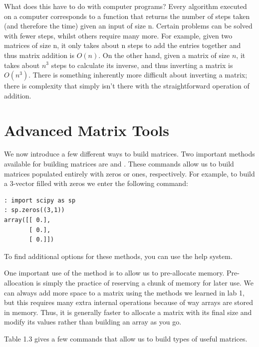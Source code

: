 What does this have to do with computer programs?  
Every algorithm executed on a computer corresponds to a function 
that returns the number of steps taken (and therefore the time) 
given an input of size n.  Certain problems can be solved with fewer steps,
whilst others require many more.  For example, given two matrices of size n,
it only takes about n steps to add the entries together and thus matrix addition is $O(n)$.  
On the other hand, given a matrix of size $n$, it takes about 
$n^3$ steps to calculate its inverse, 
and thus inverting a matrix is $O(n^3)$.
There is something inherently more difficult about inverting a matrix; 
there is complexity that simply isn't there with the straightforward operation of addition.
	
\section*{Advanced Matrix Tools}
We now introduce a few different ways to build matrices. 
Two important methods available for building matrices are  and .
These commands allow us to build matrices populated entirely with zeros or ones, respectively.
For example, to build a 3-vector filled with zeros we enter the following command:
\begin{lstlisting}
: import scipy as sp
: sp.zeros((3,1))
array([[ 0.],
       [ 0.],
       [ 0.]])
\end{lstlisting}

To find additional options for these methods, you can use the help system.


One important use of the  method is to allow us to pre-allocate memory. 
Pre-allocation is simply the practice of reserving a chunk of memory for later use.
We can always add more space to a matrix using the methods we learned in lab 1,
but this requires many extra internal operations because of way arrays are stored in memory.
Thus, it is generally faster to allocate a matrix with its final size and modify its 
values rather than building an array as you go.



Table 1.3 gives a few commands that allow us to build types of useful matrices.

